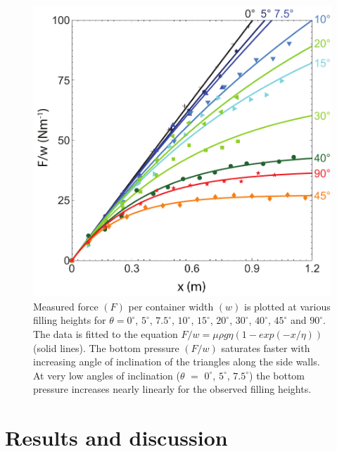 
% 
\begin{figure}
	\includegraphics[width=\textwidth]{Figures/chapter2/pressurevh}
	\caption{Measured force $(F)$ per container width $(w)$ is plotted at various filling heights for $\theta = 0^{\circ}$, $5^{\circ}$, $7.5^{\circ}$, $10^{\circ}$, $15^{\circ}$, $20^{\circ}$, $30^{\circ}$, $40^{\circ}$, $45^{\circ}$ and $90^{\circ}$. The data is fitted to the equation $F/w = \mu \rho g \eta (1 - exp(-x/\eta))$ (solid lines). The bottom pressure $(F/w)$ saturates faster with increasing angle of inclination of the triangles along the side walls. At very low angles of inclination ($\theta$ $=$ $0^{\circ}$, $5^{\circ}$, $7.5^{\circ}$) the bottom pressure increases nearly linearly for the observed filling heights.}
	\label{fig:pressurevh}
\end{figure}
%

\section{Results and discussion}

